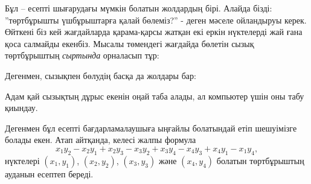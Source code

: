 Бұл -- есепті шығарудағы мүмкін болатын жолдардың бірі.
Алайда бізді: ''төртбұрышты үшбұрыштарға қалай бөлеміз?'' - деген мәселе ойландыруы керек. Өйткені
біз кей жағдайларда қарама-қарсы жатқан екі еркін нүктелерді 
жай ғана қоса салмайды екенбіз. Мысалы төмендегі жағдайда бөлетін
сызық төртбұрыштың \emph{сыртында} орналасып тұр:

\begin{center}
\end{center}
Дегенмен, сызықпен бөлудің басқа да жолдары бар:
\begin{center}
\end{center}
Адам қай сызықтың дұрыс екенін оңай таба алады, ал   компьютер үшін оны табу қиындау. 

Дегенмен бұл есепті бағдарламалаушыға ыңғайлы болатындай етіп
шешуімізге болады екен. Атап айтқанда, келесі жалпы формула
\[x_1y_2-x_2y_1+x_2y_3-x_3y_2+x_3y_4-x_4y_3+x_4y_1-x_1y_4,\]
нүктелері 
$(x_1,y_1)$,
$(x_2,y_2)$,
$(x_3,y_3)$ және
$(x_4,y_4)$ болатын төртбұрыштың ауданын есептеп береді.

